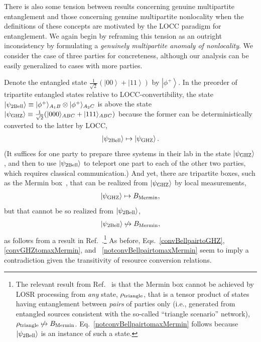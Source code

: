 \documentclass[12pt]{article}
\newcommand{\ket}[1]{\left| #1 \right>}
\theoremstyle{plain}
\theoremstyle{definition}
\begin{document}
There is also some tension between results concerning genuine multipartite entanglement and those concerning genuine multipartite nonlocality when the definitions of these concepts are motivated by the LOCC paradigm for entanglement.
We again begin by reframing this tension as an outright inconsistency
by formulating a {\em genuinely multipartite anomaly of nonlocality}.  We consider the case of three parties for concreteness, although our analysis can be easily generalized  
to cases with more parties.

Denote the entangled state ${\frac{1}{\sqrt{2}}(\ket{00}+\ket{11})}$ by $\ket{\phi^{+}}$. In the preorder of tripartite entangled states relative to LOCC-convertibility, 
the state ${\ket{\psi_{\rm 2Bell}} \equiv |\phi^{+}\rangle_{A_1B}\otimes  |\phi^{+}\rangle_{A_2C}}$ is above the state ${\ket{\psi_{\rm GHZ}} \equiv \tfrac{1}{\sqrt{2}} (|000\rangle_{ABC} +|111\rangle_{ABC})}$ because the former can be deterministically converted to the latter by LOCC,
 \begin{align} \label{convBellpairtoGHZ}
\ket{\psi_{\rm 2Bell}} \mapsto \ket{\psi_{\rm GHZ}}.
\end{align}
(It suffices for one party to prepare three systems in their lab in the state $\ket{\psi_{\rm GHZ}}$, and then to use $\ket{\psi_{\rm 2Bell}}$ to teleport one part to each of the other two parties, which requires classical communication.)
And yet, 
 there are tripartite boxes, such as the Mermin box~\cite{Mermin1990,Brassard2005},
that can be realized from $\ket{\psi_{\rm GHZ}}$ by local measurements,
\begin{align} \label{convGHZtomaxMermin}  
\ket{\psi_{\rm GHZ}} \mapsto B_{\rm Mermin},
\end{align}
but that cannot be so realized from $\ket{\psi_{\rm 2Bell}}$,
\begin{align} \label{notconvBellpairtomaxMermin}
\ket{\psi_{\rm 2Bell}} \not\mapsto B_{\rm Mermin},
\end{align}
as follows from a result in Ref.~\cite{wolfe2021infl}.\footnote{The relevant result from Ref.~\cite{wolfe2021infl} is that the Mermin box cannot be achieved by LOSR processing from
{\em any} state, $\rho_{\rm triangle}$, that is a tensor product of states having entanglement between {\em pairs} of parties only (i.e., generated from entangled sources consistent with the so-called ``triangle scenario'' network), $\rho_{\rm triangle} \not\mapsto B_{\rm Mermin}$. Eq.~\eqref{notconvBellpairtomaxMermin} follows because $\ket{\psi_{\rm 2Bell}}$ is an instance of such a state.}
As before, Eqs.~\eqref{convBellpairtoGHZ}, \eqref{convGHZtomaxMermin}, and ~\eqref{notconvBellpairtomaxMermin} seem to imply a contradiction 
 given the transitivity of resource conversion relations.
\end{document}
